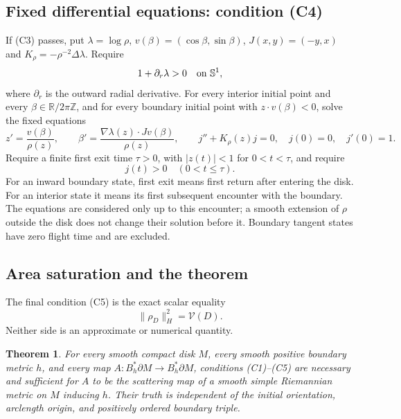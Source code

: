 \documentclass[11pt]{article}
\newtheorem{theorem}{Theorem}[section]
\theoremstyle{remark}
\newcommand{\Sone}{\mathbb S^1}
\newcommand{\Varea}{\mathcal V}
\begin{document}
\subsection{Fixed differential equations: condition (C4)}\label{subsec:c4}
If (C3) passes, put $\lambda=\log\rho$, $v(\beta)=(\cos\beta,\sin\beta)$,
$J(x,y)=(-y,x)$ and $K_\rho=-\rho^{-2}\Delta\lambda$.
Require
\begin{equation}\label{eq:convexity}
 1+\partial_r\lambda>0\quad\hbox{on }\Sone,
\end{equation}
where $\partial_r$ is the outward radial derivative. For every interior
initial point and every $\beta\in\mathbb R/2\pi\mathbb Z$, and for every
boundary initial point with $z\cdot v(\beta)<0$, solve the fixed equations
\begin{equation}\label{eq:fixed-ode}
 z'=\frac{v(\beta)}{\rho(z)},\qquad
 \beta'=\frac{\nabla\lambda(z)\cdot Jv(\beta)}{\rho(z)},\qquad
 j''+K_\rho(z)j=0,\quad j(0)=0,\quad j'(0)=1.
\end{equation}
Require a finite first exit time $\tau>0$, with $|z(t)|<1$ for
$0<t<\tau$, and require
\begin{equation}\label{eq:jacobi-positive}
 j(t)>0\quad(0<t\le\tau).
\end{equation}
For an inward boundary state, first exit means first return after
entering the disk. For an interior state it means its first subsequent
encounter with the boundary. The equations are considered only up to
this encounter; a smooth extension of $\rho$ outside the disk does not
change their solution before it. Boundary tangent states have zero flight
time and are excluded.

\subsection{Area saturation and the theorem}\label{subsec:c5}
The final condition (C5) is the exact scalar equality
\begin{equation}\label{eq:saturation}
 \|\rho_D\|_H^2=\Varea(D).
\end{equation}
Neither side is an approximate or numerical quantity.

\begin{theorem}\label{thm:main}
For every smooth compact disk $M$, every smooth positive boundary metric
$h$, and every map $A:B_h^*\partial M\to B_h^*\partial M$, conditions
(C1)--(C5) are necessary and sufficient for $A$ to be the scattering map
of a smooth simple Riemannian metric on $M$ inducing $h$. Their truth
is independent of the initial orientation, arclength origin, and positively
ordered boundary triple.
\end{theorem}
\end{document}
